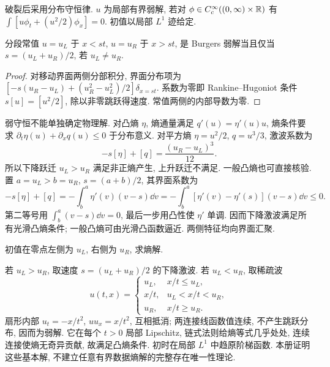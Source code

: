 破裂后采用分布守恒律. $u$ 为局部有界弱解, 若对 $\phi\in C_c^\infty((0,\infty)\times\mathbb R)$ 有 $\int[u\phi_t+(u^2/2)\phi_x]=0$. 初值以局部 $L^1$ 迹给定.
\begin{proposition}\label{prop:RH}
分段常值 $u=u_L$ 于 $x<st$, $u=u_R$ 于 $x>st$, 是 Burgers 弱解当且仅当 $s=(u_L+u_R)/2$, 若 $u_L\ne u_R$.
\end{proposition}
\begin{proof}
对移动界面两侧分部积分, 界面分布项为 $[-s(u_R-u_L)+(u_R^2-u_L^2)/2]\delta_{x=st}$. 系数为零即 Rankine--Hugoniot 条件 $s[u]=[u^2/2]$, 除以非零跳跃得速度. 常值两侧的内部导数为零.
\end{proof}
弱守恒不能单独确定物理解. 对凸熵 $\eta$, 熵通量满足 $q'(u)=\eta'(u)u$, 熵条件要求 $\partial_t\eta(u)+\partial_xq(u)\le0$ 于分布意义. 对平方熵 $\eta=u^2/2$, $q=u^3/3$, 激波系数为
\[
-s[\eta]+[q]=\frac{(u_R-u_L)^3}{12}.
\]
所以下降跃迁 $u_L>u_R$ 满足非正熵产生, 上升跃迁不满足. 一般凸熵也可直接核验. 置 $a=u_L>b=u_R$, $s=(a+b)/2$, 其界面系数为
\[
-s[\eta]+[q]=-\int_b^a\eta'(v)(v-s)\dd v
=-\int_b^a[\eta'(v)-\eta'(s)](v-s)\dd v\le0.
\]
第二等号用 $\int_b^a(v-s)\dd v=0$, 最后一步用凸性使 $\eta'$ 单调. 因而下降激波满足所有光滑凸熵条件; 一般凸熵可由光滑凸函数逼近. 两侧特征均向界面汇聚.
\begin{example}
初值在零点左侧为 $u_L$, 右侧为 $u_R$, 求熵解.
\end{example}
\begin{solution}
若 $u_L>u_R$, 取速度 $s=(u_L+u_R)/2$ 的下降激波. 若 $u_L<u_R$, 取稀疏波
\[
u(t,x)=\begin{cases}u_L,&x/t\le u_L,\\x/t,&u_L<x/t<u_R,\\u_R,&x/t\ge u_R.\end{cases}
\]
扇形内部 $u_t=-x/t^2$, $uu_x=x/t^2$, 互相抵消; 两连接线函数值连续, 不产生跳跃分布, 因而为弱解. 它在每个 $t>0$ 局部 Lipschitz, 链式法则给熵等式几乎处处, 连续连接使熵无奇异贡献, 故满足凸熵条件. 初时在局部 $L^1$ 中趋原阶梯函数. 本册证明这些基本解, 不建立任意有界数据熵解的完整存在唯一性理论.
\end{solution}
